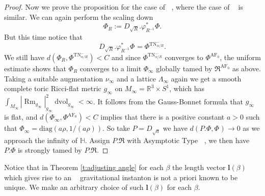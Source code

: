 \documentclass[a4paper,11pt]{amsart}
\theoremstyle{definition}
\numberwithin{equation}{section}
\newcommand{\bl}{\bm{l}}
\newcommand{\mR} {\mathfrak R}
\DeclareMathOperator{\dvol}{dvol}
\DeclareMathOperator{\Rm}{Rm}
\DeclareMathOperator{\TN}{TN}
\DeclareMathOperator{\TNam}{TN^{--}_\alpha}
\DeclareMathOperator{\ALFp}{ALF^+}
\DeclareMathOperator{\ALFm}{ALF^{--}}
\DeclareMathOperator{\AF}{AF}
\DeclareMathOperator{\AFa}{AF_\beta}
\begin{document}
\begin{proof}
    Now we prove the proposition for the case of $\ALFm$, where the case of $\ALFp$ is similar. We can again perform the scaling down $$\Phi_R:=D_{\sqrt{R}}.\varphi_{R^{-1}}^*\Phi.$$ But this time notice that $$D_{\sqrt{R}}.\varphi_{R^{-1}}^*\Phi^{\TNam}=\Phi^{\TN^-_{\alpha/R}}.$$  We still have $d(\Phi_R,\Phi^{\TN^-_{\alpha/R}})<C$ and since $\Phi^{\TN^-_{\alpha/R}}$ converges to $\Phi^{\AF_0}$, the uniform estimate shows that $\Phi_R$ converges to a limit $\Phi_\infty$ globally tamed by $\mR^{\AF_0}$ as above. Taking a suitable augmentation $\nu_\infty$ and a lattice $\Lambda_\infty$ again we get a smooth complete toric Ricci-flat metric $g_\infty$ on $M_\infty=\mathbb{R}^3\times S^1$, which has $\int_{M_\infty}|\Rm_{g_\infty}|_{g_\infty}^2\dvol_{g_\infty}<\infty$. It follows from the Gauss-Bonnet formula that $g_\infty$ is flat, and $d(\Phi_\infty,\Phi^{\AF_0})<C$ implies that there is a positive constant $a>0$ such that $\Phi_\infty=\mathrm{diag}(a\rho,1/(a\rho))$. So take $P=D_{\sqrt{a}}$ we have $d(P.\Phi,\Phi^{\TNam})\to0$ as  we approach the infinity of $\mathbb{H}$. Assign $P.\mR$ with Asymptotic Type $\ALFm$, we then have $P.\Phi$ is strongly tamed by $P.\mR$.
\end{proof}




    
    
    
    
    
    
    Notice that in Theorem \ref{t:adjusting angle} for each $\beta$ the length vector $\bl(\beta)$ which gives rise to an $\AFa$ gravitational instanton is not a priori known to be unique. We make an arbitrary choice of such $\bl(\beta)$ for each $\beta$.
\end{document}
